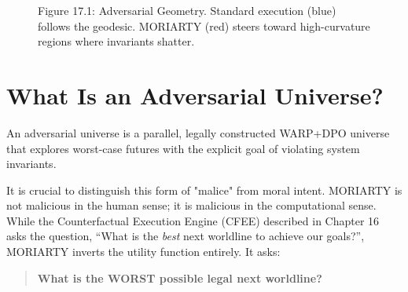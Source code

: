 \begin{figure}[h]
\centering
{}
\caption{Figure 17.1: Adversarial Geometry. Standard execution (blue) follows the geodesic. MORIARTY (red) steers toward high-curvature regions where invariants shatter.}
\label{fig:adversarial-geometry}
\end{figure}

\section{What Is an Adversarial Universe?}

An adversarial universe is a parallel, legally constructed WARP+DPO universe that explores worst-case futures with the explicit goal of violating system invariants.

It is crucial to distinguish this form of "malice" from moral intent. MORIARTY is not malicious in the human sense; it is malicious in the computational sense. While the Counterfactual Execution Engine (CFEE) described in Chapter 16 asks the question, ``What is the \textit{best} next worldline to achieve our goals?'', MORIARTY inverts the utility function entirely. It asks:

\begin{quote}
\textbf{What is the WORST possible legal next worldline?}
\end{quote}


